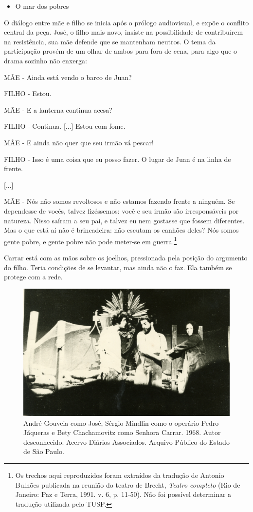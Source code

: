 \begin{itemize}
\item
  O mar dos pobres
\end{itemize}

O diálogo entre mãe e filho se inicia após o prólogo audiovisual, e
expõe o conflito central da peça. José, o filho mais novo, insiste na
possibilidade de contribuírem na resistência, sua mãe defende que se
mantenham neutros. O tema da participação provém de um olhar de ambos
para fora de cena, para algo que o drama sozinho não enxerga:

MÃE - Ainda está vendo o barco de Juan?

FILHO - Estou.

MÃE - E a lanterna continua acesa?

FILHO - Continua. {[}...{]} Estou com fome.

MÃE - E ainda não quer que seu irmão vá pescar!

FILHO - Isso é uma coisa que eu posso fazer. O lugar de Juan é na linha
de frente.

{[}...{]}

MÃE - Nós não somos revoltosos e não estamos fazendo frente a ninguém.
Se dependesse de vocês, talvez fizéssemos: você e seu irmão são
irresponsáveis por natureza. Nisso saíram a seu pai, e talvez eu nem
gostasse que fossem diferentes. Mas o que está aí não é brincadeira: não
escutam os canhões deles? Nós somos gente pobre, e gente pobre não pode
meter-se em guerra.\footnote{Os trechos aqui reproduzidos foram
  extraídos da tradução de Antonio Bulhões publicada na reunião do
  teatro de Brecht, \textit{Teatro completo} (Rio de Janeiro: Paz e Terra,
  1991. v. 6, p. 11-50). Não foi possível determinar a tradução
  utilizada pelo TUSP.}

Carrar está com as mãos sobre os joelhos, pressionada pela posição do
argumento do filho. Teria condições de se levantar, mas ainda não o faz.
Ela também se protege com a rede.

\begin{figure}
\includegraphics[width=\columnwidth]{./media/IMAGEM39.png}
\caption{André Gouveia como José, Sérgio Mindlin como o operário Pedro Jáqueras e Bety Chachamovitz como Senhora Carrar. 1968. Autor desconhecido. Acervo
Diários Associados. Arquivo Público do Estado de São Paulo.}
\end{figure}

